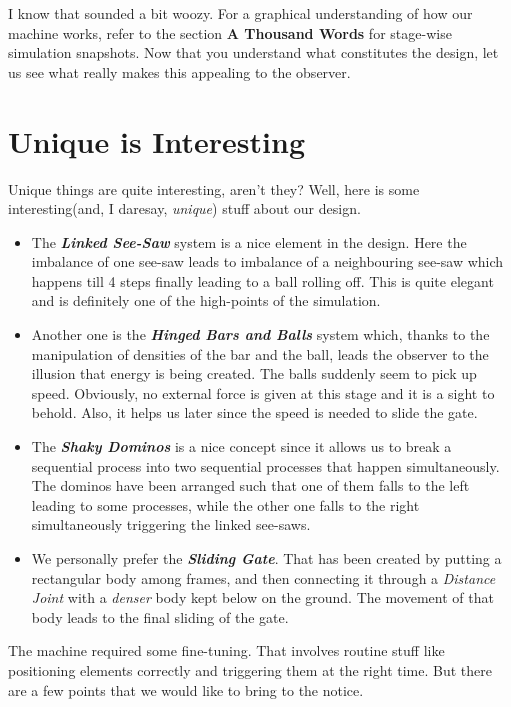 \documentclass[a4paper,11pt]{article}
\begin{document}
I know that sounded a bit woozy. For a graphical understanding of how our machine works, refer to the section \textbf{A Thousand Words} for stage-wise simulation snapshots. Now that you understand what constitutes the design, let us see what really makes this appealing to the observer.

\section{Unique is Interesting}

Unique things are quite interesting, aren't they? Well, here is some interesting(and, I daresay, \emph{unique}) stuff about our design.

\begin{itemize}
\item The \textbf{\emph{Linked See-Saw}} system is a nice element in the design. Here the imbalance of one see-saw leads to imbalance of a neighbouring see-saw which happens till 4 steps finally leading to a ball rolling off. This is quite elegant and is definitely one of the high-points of the simulation.
\item Another one is the \textbf{\emph{Hinged Bars and Balls}} system which, thanks to the manipulation of densities of the bar and the ball, leads the observer to the illusion that energy is being created. The balls suddenly seem to pick up speed. Obviously, no external force is given at this stage and it is a sight to behold. Also, it helps us later since the speed is needed to slide the gate.
\item The \textbf{\emph{Shaky Dominos}} is a nice concept since it allows us to break a sequential process into two sequential processes that happen simultaneously. The dominos have been arranged such that one of them falls to the left leading to some processes, while the other one falls to the right simultaneously triggering the linked see-saws.
\item We personally prefer the \textbf{\emph{Sliding Gate}}. That has been created by putting a rectangular body among frames, and then connecting it through a \emph{Distance Joint} with a \emph{denser} body kept below on the ground. The movement of that body leads to the final sliding of the gate.
\end{itemize}

The machine required some fine-tuning. That involves routine stuff like positioning elements correctly and triggering them at the right time. But there are a few points that we would like to bring to the notice.
\end{document}
